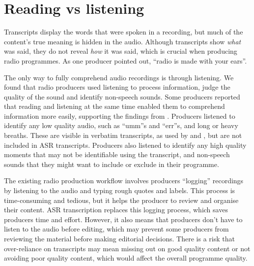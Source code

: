
\section{Reading vs listening}

Transcripts display the words that were spoken in a recording, but much of the content's true meaning is hidden in the
audio. Although transcripts show \textit{what} was said, they do not reveal \textit{how} it was said, which is crucial
when producing radio programmes.  As one producer pointed out, ``radio is made with your ears''.

The only way to fully comprehend audio recordings is through listening.  We found that radio producers used listening
to process information, judge the quality of the sound and identify non-speech sounds.  Some producers reported that
reading and listening at the same time enabled them to comprehend information more easily, supporting the findings from
\citet{Vemuri2004}.  Producers listened to identify any low quality audio, such as ``umm''s and ``err''s, and long or heavy
breaths. These are visible in verbatim transcripts, as used by \citet{Berthouzoz2012} and \citet{Rubin2013}, but are
not included in ASR transcripts.  Producers also listened to identify any high quality moments that may not be
identifiable using the transcript, and non-speech sounds that they might want to include or exclude in their programme.


The existing radio production workflow involves producers ``logging'' recordings by listening to the audio and typing
rough quotes and labels.  This process is time-consuming and tedious, but it helps the producer to review and organise
their content.  ASR transcription replaces this logging process, which saves producers time and effort. However, it
also means that producers don't have to listen to the audio before editing, which may prevent some producers from
reviewing the material before making editorial decisions.  There is a risk that over-reliance on transcripts may mean
missing out on good quality content or not avoiding poor quality content, which would affect the overall programme
quality.

